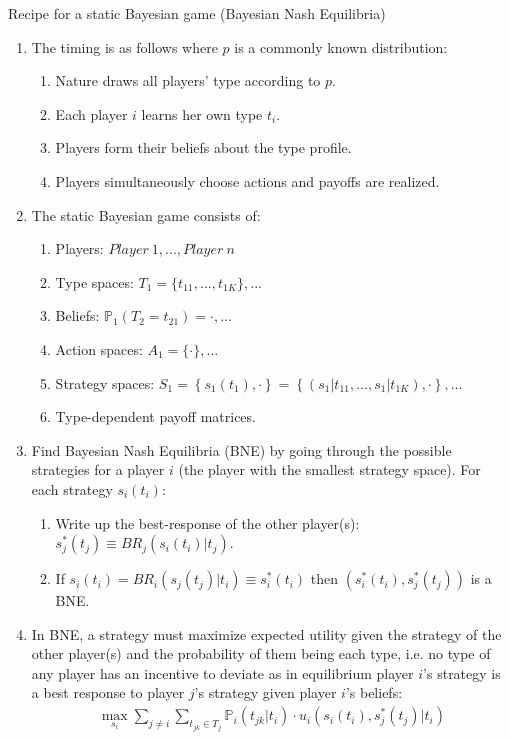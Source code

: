 \begin{frame}{Recipe for a static Bayesian game (Bayesian Nash Equilibria)}
    \begin{enumerate}
      \item The timing is as follows where $p$ is a commonly known distribution:
      \begin{enumerate}\normalsize
        \item Nature draws all players' type according to $p$.
        \item Each player $i$ learns her own type $t_{i}$.
        \item Players form their beliefs about the type profile.
        \item Players simultaneously choose actions and payoffs are realized.
      \end{enumerate}
      \item The static Bayesian game consists of:
      \begin{enumerate}\normalsize
        \item Players: $Player\ 1,...,Player\ n$
        \item Type spaces: $T_1=\{t_{11},...,t_{1K}\},...$
        \item Beliefs: $\mathbb{P}_1(T_2=t_{21})=\cdot,...$
        \item Action spaces: $A_1=\{\cdot\},...$
        \item Strategy spaces: $S_1=\left\{s_1(t_1),\cdot\right\}=\left\{(s_1|t_{11},...,s_1|t_{1K}),\cdot\right\},...$
        \item Type-dependent payoff matrices.
      \end{enumerate}
      \item Find Bayesian Nash Equilibria (BNE) by going through the possible strategies for a player $i$ (the player with the smallest strategy space). For each strategy $s_i(t_i)$:
      \begin{enumerate}\normalsize
        \item Write up the best-response of the other player(s): $s_j^*(t_j)\equiv BR_j\left(s_i(t_i)|t_j\right)$.
        \item If $s_i(t_i)=BR_i\left(s_j(t_j)|t_i\right)\equiv s_i^*(t_i)$ then $\left(s_i^*(t_i),s_j^*(t_j)\right)$ is a BNE.
      \end{enumerate}
      \item In BNE, a strategy must maximize expected utility given the strategy of the other player(s) and the probability of them being each type, i.e. no type of any player has an incentive to deviate as in equilibrium player $i$'s strategy is a best response to player $j$'s strategy given player $i$'s beliefs:
      \begin{align*}
        \max\limits_{s_i}\sum\limits_{j\neq i}\sum\limits_{t_{jk}\in T_j}\mathbb{P}_i(t_{jk}|t_i)\cdot u_i\left(s_i(t_i),s_j^*(t_j)|t_i\right)
      \end{align*}
    \end{enumerate}
    \vfill\null
\end{frame}



